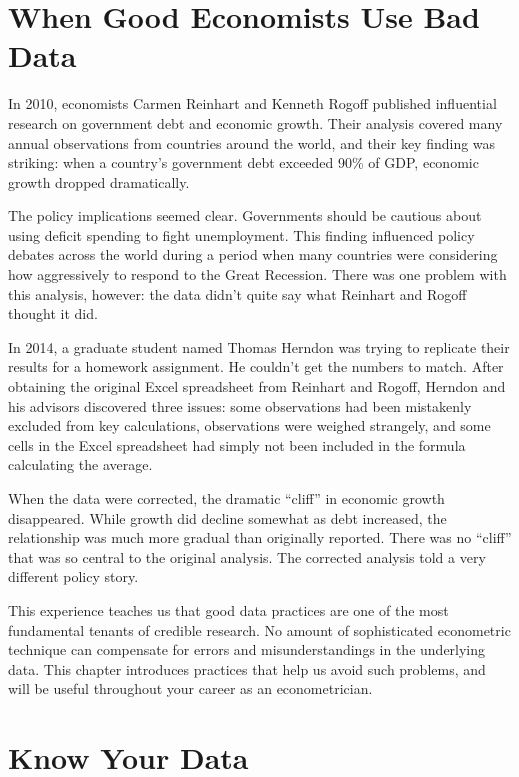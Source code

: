 \documentclass[
  letterpaper,
  DIV=11,
  numbers=noendperiod]{scrreprt}
\begin{document}
\section{When Good Economists Use Bad
Data}\label{when-good-economists-use-bad-data}

In 2010, economists Carmen Reinhart and Kenneth Rogoff published
influential research on government debt and economic growth. Their
analysis covered many annual observations from countries around the
world, and their key finding was striking: when a country's government
debt exceeded 90\% of GDP, economic growth dropped dramatically.

The policy implications seemed clear. Governments should be cautious
about using deficit spending to fight unemployment. This finding
influenced policy debates across the world during a period when many
countries were considering how aggressively to respond to the Great
Recession. There was one problem with this analysis, however: the data
didn't quite say what Reinhart and Rogoff thought it did.

In 2014, a graduate student named Thomas Herndon was trying to replicate
their results for a homework assignment. He couldn't get the numbers to
match. After obtaining the original Excel spreadsheet from Reinhart and
Rogoff, Herndon and his advisors discovered three issues: some
observations had been mistakenly excluded from key calculations,
observations were weighed strangely, and some cells in the Excel
spreadsheet had simply not been included in the formula calculating the
average.

When the data were corrected, the dramatic ``cliff'' in economic growth
disappeared. While growth did decline somewhat as debt increased, the
relationship was much more gradual than originally reported. There was
no ``cliff'' that was so central to the original analysis. The corrected
analysis told a very different policy story.

This experience teaches us that good data practices are one of the most
fundamental tenants of credible research. No amount of sophisticated
econometric technique can compensate for errors and misunderstandings in
the underlying data. This chapter introduces practices that help us
avoid such problems, and will be useful throughout your career as an
econometrician.

\section{Know Your Data}\label{know-your-data}
\end{document}
